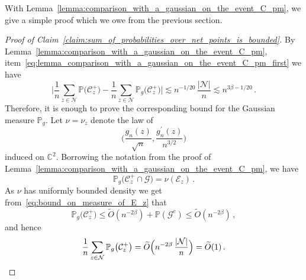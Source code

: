 \documentclass[11pt]{amsart}
\theoremstyle{remark}
\theoremstyle{definition}
\newcommand{\bC}{\mathbb C}
\newcommand{\bP}{\mathbb P}
\newcommand{\cE}{\mathcal{E}}
\newcommand{\cC}{\mathcal C}
\newcommand{\cN}{\mathcal N}
\newcommand{\cG}{\mathcal G}
\begin{document}
    With Lemma~\ref{lemma:comparison_with_a_gaussian_on_the_event_C_pm}, we give a simple proof which we owe from the previous section. 
    \begin{proof}[Proof of Claim~\ref{claim:sum_of_probabilities_over_net_points_is_bounded}]
        By Lemma~\ref{lemma:comparison_with_a_gaussian_on_the_event_C_pm}, item~\eqref{eq:lemma_comparison_with_a_gaussian_on_the_event_C_pm_first} we have 
        \[
        \bigg|\frac{1}{n} \sum_{z\in \cN} \bP\big(\cC_z^+ \big) - \frac{1}{n} \sum_{z\in \cN} \bP_g\big(\cC_z^+ \big) \bigg|\lesssim n^{-1/20} \, \frac{|\cN|}{n} \lesssim n^{3\beta-1/20} \, .
        \]
        Therefore, it is enough to prove the corresponding bound for the Gaussian measure $\bP_g$. Let $\nu=\nu_z$ denote the law of 
        \[
        \Big(\frac{g_n(z)}{\sqrt{n}},\frac{g_n^\prime(z)}{n^{3/2}}\Big)
        \]
        induced on $\bC^2$. Borrowing the notation from the proof of Lemma~\ref{lemma:comparison_with_a_gaussian_on_the_event_C_pm}, we have
        \[
        \bP_g\big(\cC_z^+\cap \cG\big) = \nu(\cE_z) \, .
        \]
        As $\nu$ has uniformly bounded density we get from~\eqref{eq:bound_on_measure_of_E_z} that
        \[
        \bP_g\big(\cC_z^+\big)  \le \widetilde{O}(n^{-2\beta}) + \bP(\cG^c) \le \widetilde{O}(n^{-2\beta}) \, ,
        \]
        and hence
        \[
        \frac{1}{n} \sum_{z\in \cN} \bP_g\big(\cC_z^+ \big) = \widetilde{O}\Big(n^{-2\beta} \, \frac{|\cN|}{n}\Big) = \widetilde{O}(1) \,. \qedhere 
        \]
    \end{proof}
\end{document}
